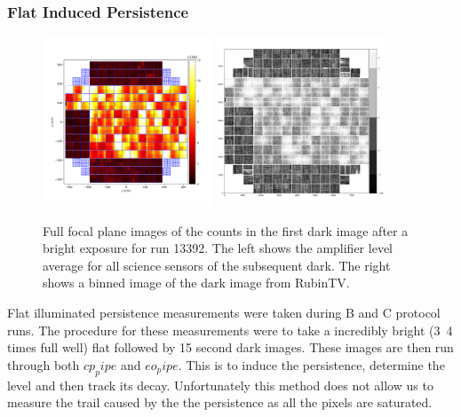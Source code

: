 \documentclass[DM,authoryear,toc]{lsstdoc}
\begin{document}
\subsubsection{Flat Induced Persistence}
\begin{figure}[!htp]
  \centering
  \includegraphics[width=0.45\textwidth, angle=0]{Run_13392_Persistence.png}
  \includegraphics[width=0.45\textwidth, angle=0]{Persistence_Flat_Example.png}
  \caption{
  Full focal plane images of the counts in the first dark image after a bright exposure for run 13392.
  The left shows the amplifier level average for all science sensors of the subsequent dark.
  The right shows a binned image of the dark image from RubinTV\@.
  }\label{fig:Flat_Induced}
\end{figure}

Flat illuminated persistence measurements were taken during B and C protocol runs.
The procedure for these measurements were to take a incredibly bright (3~4 times full well) flat followed by 15 second dark images.
These images are then run through both \texttt{$cp_pipe$} and \texttt{$eo_pipe$}.
This is to induce the persistence, determine the level and then track its decay.
Unfortunately this method does not allow us to measure the trail caused by the the persistence as all the pixels are saturated.
\end{document}
